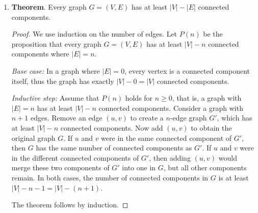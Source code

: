 \documentclass[11pt]{article}
\begin{document}
\begin{enumerate}
  \item 
    \textbf{Theorem}. Every graph $G=(V,E)$ has at least $|V|-|E|$
    connected components. \\
    \begin{proof}
      We use induction on the number of edges. Let $P(n)$ be the
      proposition that every graph $G=(V,E)$ has at least $|V|-n$
      connected components where $|E|=n$. 

      \emph{Base case:} In a graph where $|E|=0$, every vertex is a
      connected component itself, thus the graph has exactly
      $|V|-0=|V|$ connected components. 

      \emph{Inductive step:} Assume that $P(n)$ holds for $n \geq 0$,
      that is, a graph with $|E|=n$ has at least $|V|-n$ connected
      components. Consider a graph with $n+1$ edges. Remove an edge
      $(u,v)$ to create a $n$-edge graph $G'$, which has at least
      $|V|-n$ connected components. Now add $(u,v)$ to obtain the
      original graph $G$. If
      $u$ and $v$ were in the same connected component of $G'$, then
      $G$ has the same number of connected components as $G'$. If $u$
      and $v$ were in the different connected components of $G'$, then
      adding $(u,v)$ would merge these two components of $G'$ into one in
      $G$, but all other components remain. In both cases, the number
      of connected components in $G$ is at least $|V|-n-1=|V|-(n+1)$.

      The theorem follows by induction. 
    \end{proof}
\end{enumerate}
\end{document}
